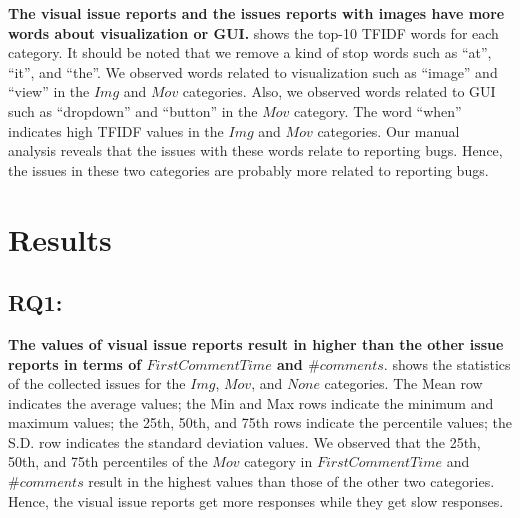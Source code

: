 \textbf{The visual issue reports and the issues 
reports with images have more words 
about visualization or GUI.}
 shows the top-10 TFIDF words
for each category.
It should be noted that we remove a kind of stop words such as 
``at'', ``it'', and ``the''. 
We observed words related to visualization such as 
``image'' and ``view'' in the $Img$ and $Mov$ categories. 
Also, we observed words related to GUI such as 
``dropdown'' and ``button'' in the $Mov$ category. 
The word ``when'' indicates high TFIDF values 
in the $Img$ and $Mov$ categories. 
Our manual analysis reveals that the issues with 
these words relate to reporting bugs. 
Hence, the issues in these two categories are 
probably more related to reporting bugs. 

\section{Results}
\label{sec:results}



% 


\subsection{RQ1: \RQone{}}
\textbf{The values of visual issue reports 
result in higher than the other issue reports 
in terms of $FirstCommentTime$ and $\#comments$}. 
 shows the statistics
of the collected issues for the $Img$, $Mov$,
and $None$ categories.
The Mean row indicates the average values; 
the Min and Max rows indicate the minimum and maximum values; 
the 25th, 50th, and 75th rows indicate the percentile values; 
the S.D. row indicates the standard deviation values. 
We observed that the 25th, 50th, and 75th percentiles of 
the $Mov$ category in $FirstCommentTime$ and $\#comments$ 
result in the highest values than those of 
the other two categories.
Hence, the visual issue reports get more responses 
while they get slow responses. 

